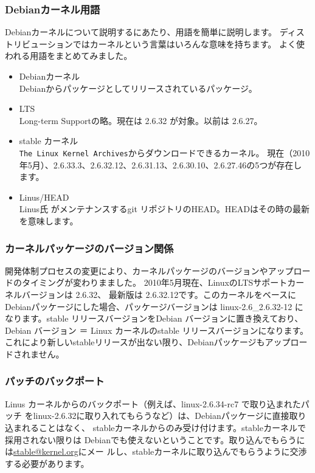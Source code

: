 \documentclass[mingoth,a4paper]{jsarticle}
\begin{document}
\subsubsection{Debianカーネル用語}
Debianカーネルについて説明するにあたり、用語を簡単に説明します。
ディストリビューションではカーネルという言葉はいろんな意味を持ちます。
よく使われる用語をまとめてみました。
\begin{itemize}
\item Debianカーネル\\
Debianからパッケージとしてリリースされているパッケージ。
\item LTS \\
Long-term Supportの略。現在は 2.6.32 が対象。以前は 2.6.27。
\item stable カーネル \\
\texttt{The Linux Kernel Archives}からダウンロードできるカーネル。
現在（2010年5月）、2.6.33.3、2.6.32.12、2.6.31.13、2.6.30.10、2.6.27.46の5つが存在し
ます。
\item Linus/HEAD \\
Linus氏 がメンテナンスするgit リポジトリのHEAD。HEADはその時の最新を意味します。
\end{itemize}

\subsubsection{カーネルパッケージのバージョン関係}

開発体制プロセスの変更により、カーネルパッケージのバージョンやアップロー
ドのタイミングが変わりまました。
2010年5月現在、LinuxのLTSサポートカーネルバージョンは 2.6.32、
最新版は 2.6.32.12です。このカーネルをベースにDebianパッケージにした場合、パッケージバージョンは
linux-2.6\_2.6.32-12 になります。stable リリースバージョンをDebian
バージョンに置き換えており、Debian バージョン ＝ Linux カーネルのstable
リリースバージョンになります。
これにより新しいstableリリースが出ない限り、Debianパッケージもアップロー
ドされません。

\subsubsection{パッチのバックポート}
Linus カーネルからのバックポート（例えば、linux-2.6.34-rc7 で取り込まれたパッチ
をlinux-2.6.32に取り入れてもらうなど）は、Debianパッケージに直接取り込まれることはなく、
stableカーネルからのみ受け付けます。stableカーネルで採用されない限りは
Debianでも使えないということです。取り込んでもらうには\url{stable@kernel.org}にメー
ルし、stableカーネルに取り込んでもらうように交渉する必要があります。
\end{document}
